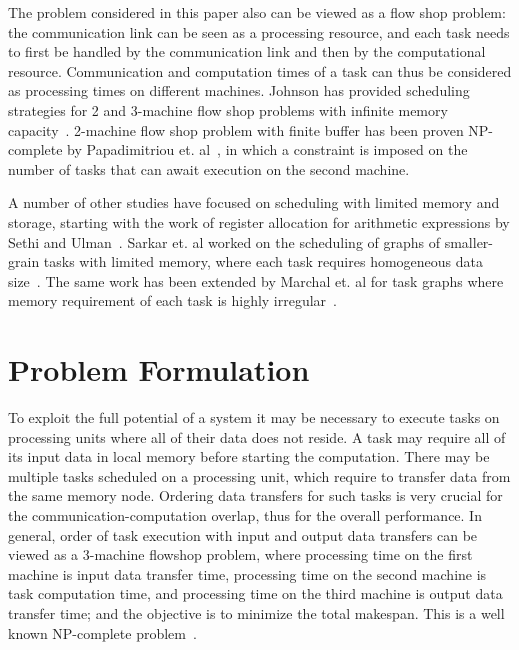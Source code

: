 \documentclass[sigconf]{acmart}
\begin{document}
	The problem considered in this paper also can be viewed as a flow shop problem: the communication link can be seen as a processing resource, and each task needs to first be handled by the communication link and then by the computational resource. Communication and computation times of a task can thus be considered as processing times on different machines. Johnson has provided scheduling strategies for 2 and 3-machine flow shop problems with infinite memory capacity~\cite{johnson}. 2-machine flow shop problem with finite buffer has been proven NP-complete by Papadimitriou et. al~\cite{Papadimitriou:1980:FSL:322203.322213}, in which a constraint is imposed on the number of tasks that can await execution on the second machine.
	
	A number of other studies have focused on scheduling with limited memory and storage, starting with the work of register allocation for arithmetic expressions by Sethi and Ulman~\cite{Sethi:1970:GOC:321607.321620}. Sarkar et. al worked on the scheduling of graphs of smaller-grain tasks with limited memory, where each task requires homogeneous data size~\cite{vsarkar-pact}. The same work has been extended by Marchal et. al for task graphs where memory requirement of each task is highly irregular~\cite{loris-ipdps18}.
	
	
	
	\section{Problem Formulation}
	\label{sec:theoreticalProof}
	
	To exploit the full potential of a system it may be necessary to execute tasks on processing
	units where all of their data does not reside. A task may require all of its input data
	in local memory before starting the computation. There may be multiple tasks
	scheduled on a processing unit, which require to transfer data from the same
	memory node. Ordering data transfers for such tasks is very crucial for the
	communication-computation overlap, thus for the overall
	performance. In general, order of task execution with input
	and output data transfers can be  
	viewed as a 3-machine flowshop problem, where processing time on the first machine is 
	input data transfer time, processing time on the second machine is task computation time, 
	and processing time on the third machine is output data transfer time; and the objective is 
	to minimize the total makespan. This is a well known NP-complete problem~\cite{3machineFlowShopNPComplete}.
	
\end{document}
